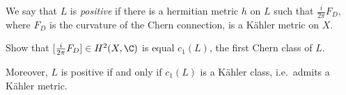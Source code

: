 \documentclass[a4paper]{article}
\begin{document}
\begin{definition}[positive]
  We say that \(L\) is \emph{positive} if there is a hermitian metric \(h\) on \(L\) such that \(\frac{i}{2\pi}F_D\), where \(F_D\) is the curvature of the Chern connection, is a Kähler metric on \(X\).
\end{definition}

\begin{ex}
  Show that \([\frac{i}{2\pi} F_D] \in H^2(X, \C)\) is equal \(c_1(L)\), the first Chern class of \(L\).
\end{ex}
Moreover, \(L\) is positive if and only if \(c_1(L)\) is a Kähler class, i.e.\ admits a Kähler metric.







 












\printindex
\end{document}
